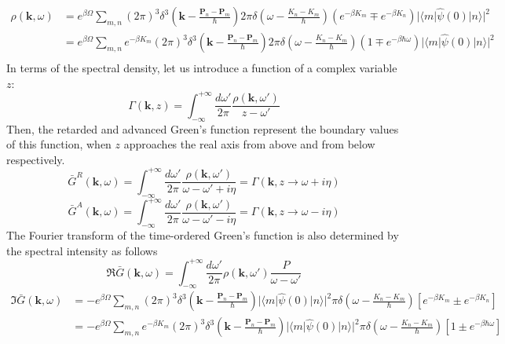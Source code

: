 \begin{equation}
\begin{aligned}
\rho(\mathbf{k},\omega)&=e^{\beta\Omega} \sum_{m,n} (2\pi)^3 \delta^3 (\mathbf{k}-\frac{\mathbf{P}_n-\mathbf{P}_m}{\hbar}) 2\pi \delta(\omega-\frac{K_n-K_m}{\hbar}) \left( e^{-\beta K_m} \mp e^{-\beta K_n} \right) |\langle m|\hat{\psi}(0) |n\rangle |^2\\
&=e^{\beta\Omega} \sum_{m,n} e^{-\beta K_m} (2\pi)^3 \delta^3 (\mathbf{k}-\frac{\mathbf{P}_n-\mathbf{P}_m}{\hbar}) 2\pi \delta(\omega-\frac{K_n-K_m}{\hbar}) \left( 1 \mp e^{-\beta \hbar \omega} \right) |\langle m|\hat{\psi}(0) |n\rangle |^2\\
\end{aligned}
\end{equation}
 In terms of the spectral density, let us introduce a function of a complex variable $z$:
\begin{equation}
\Gamma(\mathbf{k},z)=\int_{-\infty}^{+\infty} \frac{d\omega'}{2\pi} \frac{\rho(\mathbf{k},\omega')}{z-\omega'}
\end{equation}
Then, the retarded and advanced Green's function represent the boundary values of this function, when $z$ approaches the real axis from above and from below respectively.
\begin{equation}
\bar G^R(\mathbf{k},\omega)=\int_{-\infty}^{+\infty} \frac{d\omega'}{2\pi} \frac{\rho(\mathbf{k},\omega')}{\omega-\omega'+i\eta}=\Gamma(\mathbf{k},z\to\omega +i\eta)
\end{equation}
\begin{equation}\label{eq4.7.17}
\bar G^A(\mathbf{k},\omega)=\int_{-\infty}^{+\infty} \frac{d\omega'}{2\pi} \frac{\rho(\mathbf{k},\omega')}{\omega-\omega'-i\eta}=\Gamma(\mathbf{k},z\to\omega -i\eta)
\end{equation}
 The Fourier transform of the time-ordered Green's function is also determined by the spectral intensity as follows
\begin{equation}
\Re \bar G (\mathbf{k},\omega) =\int_{-\infty}^{+\infty} \frac{d\omega'}{2\pi} \rho(\mathbf{k},\omega') \frac{P}{\omega-\omega'}
\end{equation}
\[
\begin{aligned}
\Im \bar G (\mathbf{k},\omega)&=-e^{\beta\Omega} \sum_{m,n} (2\pi)^3 \delta^3 (\mathbf{k}-\frac{\mathbf{P}_n-\mathbf{P}_m}{\hbar}) |\langle m|\hat{\psi}(0) |n\rangle |^2 \pi \delta(\omega-\frac{K_n-K_m}{\hbar}) [e^{-\beta K_m}\pm e^{-\beta K_n}]\\
&=-e^{\beta\Omega} \sum_{m,n} e^{-\beta K_m}(2\pi)^3 \delta^3 (\mathbf{k}-\frac{\mathbf{P}_n-\mathbf{P}_m}{\hbar}) |\langle m|\hat{\psi}(0) |n\rangle |^2 \pi \delta(\omega-\frac{K_n-K_m}{\hbar}) [1\pm e^{-\beta \hbar \omega}]
\end{aligned}
\]
